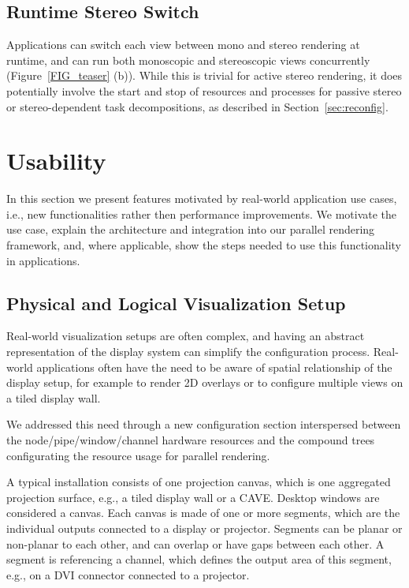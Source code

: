 \documentclass[10pt,journal,compsoc]{IEEEtran}
\newcommand{\sref}[1]{Section~\ref{#1}}
\newcommand{\fig}[1]{Figure~\ref{#1}}
\begin{document}
\subsection{Runtime Stereo Switch}

Applications can switch each view between mono and stereo rendering at runtime,
and can run both monoscopic and stereoscopic views concurrently
(\fig{FIG_teaser} (b)). While this is trivial for active stereo rendering, it
does potentially involve the start and stop of resources and processes for
passive stereo or stereo-dependent task decompositions, as described in
\sref{sec:reconfig}.

\section{Usability}

In this section we present features motivated by real-world application use
cases, i.e., new functionalities rather then performance improvements. We
motivate the use case, explain the architecture and integration into our
parallel rendering framework, and, where applicable, show the steps needed to
use this functionality in applications.

\subsection{Physical and Logical Visualization Setup}

Real-world visualization setups are often complex, and having an abstract
representation of the display system can simplify the configuration
process. Real-world applications often have the need to be aware of spatial
relationship of the display setup, for example to render 2D overlays or to
configure multiple views on a tiled display wall.

We addressed this need through a new configuration section interspersed between
the node/pipe/window/channel hardware resources and the compound trees
configurating the resource usage for parallel rendering.

A typical installation consists of one projection canvas, which is one
aggregated projection surface, e.g., a tiled display wall or a CAVE. Desktop
windows are considered a canvas. Each canvas is made of one or more segments,
which are the individual outputs connected to a display or projector. Segments
can be planar or non-planar to each other, and can overlap or have gaps between
each other. A segment is referencing a channel, which defines the output area of
this segment, e.g., on a DVI connector connected to a projector.
\end{document}
